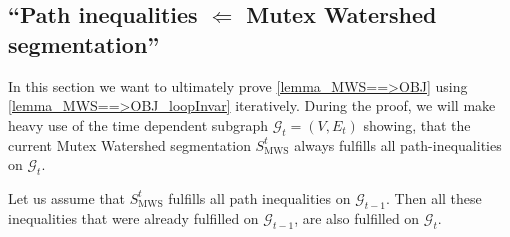 \subsection{``Path inequalities $\Leftarrow$ Mutex Watershed segmentation''}

In this section we want to ultimately prove \autoref{lemma_MWS==>OBJ} using \autoref{lemma_MWS==>OBJ_loopInvar} iteratively. During the proof, we will make heavy use of the time dependent subgraph $\mathcal{G}_{t}=(V,E_{t})$ showing, that the current Mutex Watershed segmentation $S_{\mathrm{MWS}}^{t}$ always fulfills all path-inequalities on $\mathcal{G}_t$.

\begin{proposition}\label{cor:previous_path_ineq_are_fulfilled}
Let us assume that $S_{\mathrm{MWS}}^{t}$ fulfills all path inequalities
on $\mathcal{G}_{t-1}$. Then all these inequalities that were already
fulfilled on $\mathcal{G}_{t-1}$, are also fulfilled on $\mathcal{G}_{t}$.
\end{proposition}
